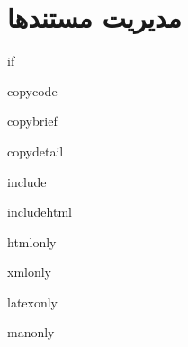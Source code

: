 

\section{مدیریت مستندها}

if

copycode

copybrief

copydetail

include

includehtml

htmlonly

xmlonly

latexonly

manonly


